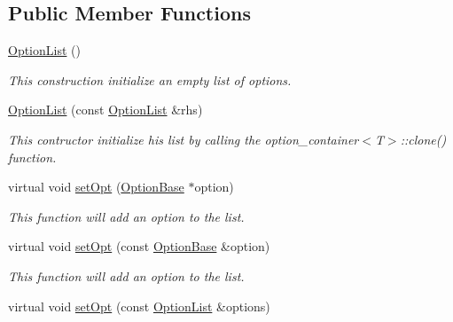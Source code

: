 \subsection*{Public Member Functions}
\begin{DoxyCompactItemize}
\item 
\hypertarget{classcurlpp_1_1internal_1_1OptionList_ab4ab4f470c3c916ed0d06469a280fb2e}{\hyperlink{classcurlpp_1_1internal_1_1OptionList_ab4ab4f470c3c916ed0d06469a280fb2e}{Option\-List} ()}\label{classcurlpp_1_1internal_1_1OptionList_ab4ab4f470c3c916ed0d06469a280fb2e}

\begin{DoxyCompactList}\small\item\em This construction initialize an empty list of options. \end{DoxyCompactList}\item 
\hypertarget{classcurlpp_1_1internal_1_1OptionList_a2deec6668c1e69eafb2ac7259b3fa534}{\hyperlink{classcurlpp_1_1internal_1_1OptionList_a2deec6668c1e69eafb2ac7259b3fa534}{Option\-List} (const \hyperlink{classcurlpp_1_1internal_1_1OptionList}{Option\-List} \&rhs)}\label{classcurlpp_1_1internal_1_1OptionList_a2deec6668c1e69eafb2ac7259b3fa534}

\begin{DoxyCompactList}\small\item\em This contructor initialize his list by calling the option\-\_\-container$<$\-T$>$\-::clone() function. \end{DoxyCompactList}\item 
virtual void \hyperlink{classcurlpp_1_1internal_1_1OptionList_a16d87ab2dc8f2729014439f6dad3735f}{set\-Opt} (\hyperlink{classcurlpp_1_1OptionBase}{Option\-Base} $\ast$option)
\begin{DoxyCompactList}\small\item\em This function will add an option to the list. \end{DoxyCompactList}\item 
virtual void \hyperlink{classcurlpp_1_1internal_1_1OptionList_a6838ee298ffe792709e8346a46547661}{set\-Opt} (const \hyperlink{classcurlpp_1_1OptionBase}{Option\-Base} \&option)
\begin{DoxyCompactList}\small\item\em This function will add an option to the list. \end{DoxyCompactList}\item 
\hypertarget{classcurlpp_1_1internal_1_1OptionList_a72b762b89ce540e7f81aa4db16bceb72}{virtual void \hyperlink{classcurlpp_1_1internal_1_1OptionList_a72b762b89ce540e7f81aa4db16bceb72}{set\-Opt} (const \hyperlink{classcurlpp_1_1internal_1_1OptionList}{Option\-List} \&options)}\label{classcurlpp_1_1internal_1_1OptionList_a72b762b89ce540e7f81aa4db16bceb72}


\end{DoxyCompactItemize}
